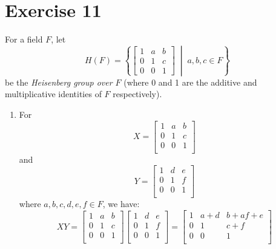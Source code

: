 \documentclass[12pt]{article}
\begin{document}
    \section*{Exercise 11}
    For a field $F$,
    let \[H(F) = \left\{
    \begin{bmatrix} 1 & a & b \\ 0 & 1 & c \\ 0 & 0 & 1 \end{bmatrix}
    \; \middle\vert \; a, b, c \in F \right\}\]
    be the \textit{Heisenberg group over $F$} (where 0 and 1 are the
    additive and multiplicative identities of $F$ respectively). \\
    \begin{enumerate}[label=\textbf{\alph*.}]
        \item 
            For
            \[ X =
            \begin{bmatrix}
                1 & a & b \\
                0 & 1 & c \\
                0 & 0 & 1 \\
            \end{bmatrix}
            \]
            and
            \[ Y =
            \begin{bmatrix}
                1 & d & e \\
                0 & 1 & f \\
                0 & 0 & 1 \\
            \end{bmatrix} \]
            where $a, b, c, d, e, f \in F$,
            we have:
            \[ XY =
            \begin{bmatrix}
                1 & a & b \\
                0 & 1 & c \\
                0 & 0 & 1 \\
            \end{bmatrix}
            \begin{bmatrix}
                1 & d & e \\
                0 & 1 & f \\
                0 & 0 & 1 \\
            \end{bmatrix}
            = \begin{bmatrix}
                1 & a+d & b + af + e \\
                0 & 1 & c+f \\
                0 & 0 & 1 \\

\end{bmatrix}\]
\end{enumerate}
\end{document}
